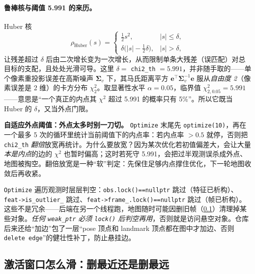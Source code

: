 \paragraph{鲁棒核与阈值 5.991 的来历。}
Huber 核
\begin{equation}
\rho_{\text{Huber}}(s)=\begin{cases}\tfrac12 s^2,& |s|\le\delta,\\[0.4ex] \delta\big(|s|-\tfrac12\delta\big),& |s|>\delta,\end{cases}
\label{eq:sys-huber}
\end{equation}
让残差超过 $\delta$ 后由二次增长变为一次增长，从而限制单条大残差（误匹配）对总目标的支配，且处处光滑可导。这里 $\delta=$ \texttt{chi2\_th} $=5.991$，并非随手取的——单个像素重投影误差在高斯噪声 $\boldsymbol\Sigma_v$ 下，其马氏距离平方 $\mathbf{e}^\top\boldsymbol\Sigma_v^{-1}\mathbf{e}$ 服从\emph{自由度 2}（像素误差是 2 维）的卡方分布 $\chi^2_2$。取显著性水平 $\alpha=0.05$，临界值 $\chi^2_{2,0.05}=5.991$——意思是“一个真正的内点其 $\chi^2$ 超过 5.991 的概率只有 5\%”。所以它既当 Huber 的 $\delta$，又当外点门限。

\begin{insight}
\textbf{自适应外点阈值：外点太多时别一刀切。}
\texttt{Optimize} 末尾先 \texttt{optimize(10)}，再在一个最多 5 次的循环里统计当前阈值下的内点率：若内点率 $>0.5$ 就停，否则把 \texttt{chi2\_th} \emph{翻倍}放宽再统计。为什么要放宽？因为某次优化若初值偏差大，会让大量\emph{本是内点}的边的 $\chi^2$ 也暂时偏高；这时若死守 5.991，会把过半观测误杀成外点、地图被掏空。翻倍放宽是一种“软”判定：先保住足够内点撑住优化，下一轮地图收敛后再收紧。
\end{insight}

\begin{pitfall}
\texttt{Optimize} 遍历观测时层层判空：\verb|obs.lock()==nullptr| 跳过（特征已析构）、\verb|feat->is_outlier_| 跳过、\verb|feat->frame_.lock()==nullptr| 跳过（帧已析构）。这些不是冗余——后端在另一个线程跑，地图随时可能因删旧帧（\cref{sec:sys-slidewindow}）清理掉某些对象。\emph{任何 \texttt{weak\_ptr} 必须 \texttt{lock()} 后判空再用}，否则就是访问悬空对象。仓库后来还给“加边”包了一层“pose 顶点和 landmark 顶点都在图中才加边、否则 \texttt{delete edge}”的健壮性补丁，防止悬挂边。
\end{pitfall}

\subsection{激活窗口怎么滑：删最近还是删最远}
\label{sec:sys-slidewindow}

